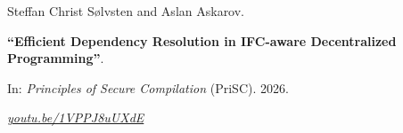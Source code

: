 Steffan Christ Sølvsten and Aslan Askarov.

{\bf ``Efficient Dependency Resolution in IFC-aware Decentralized Programming''}.

In: \emph{Principles of Secure Compilation} (PriSC).
2026.

\medskip
\href{https://youtu.be/1VPPJ8uUXdE}{\emph{youtu.be/1VPPJ8uUXdE}}

\label{cite:2026.prisc}
